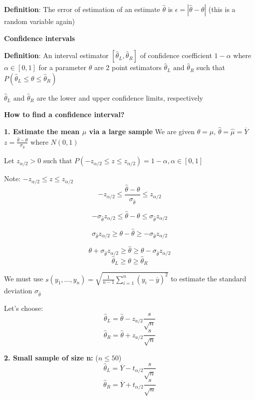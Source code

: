 \documentclass[12pt, letterpaper]{article}
\begin{document}
\textbf{Definition}: The error of estimation of an estimate $\hat{\theta}$ is $\epsilon=|\hat{\theta}-\theta|$ (this is a random variable again)\bigskip

\textbf{Confidence intervals}\bigskip

\textbf{Definition}: An interval estimator $[\hat{\theta}_L, \hat{\theta}_R]$ of confidence coefficient $1-\alpha$ where $\alpha \in[0,1]$ for a parameter $\theta$ are 2 point estimators $\hat{\theta}_L \text{ and }\hat{\theta}_R$ such that $P(\hat{\theta}_L\leq \theta \leq \hat{\theta}_R)$\newline

$\hat{\theta}_L \text{ and } \hat{\theta}_R$ are the lower and upper confidence limits, respectively\newline

\textbf{How to find a confidence interval?}

\textbf{1. Estimate the mean $\mu$ via a large sample}\newline
We are given $\theta =\mu \text{, }\hat{\theta} = \hat{\mu}=\overline{Y}$
$z=\frac{\hat{\theta}-\theta}{\sigma_{\hat{\theta}}} \text{ where } N(0,1)$

Let $z_{\alpha/2}>0 \text{ such that } P(-z_{\alpha/2}\leq z\leq z_{\alpha/2})= 1-\alpha, \alpha \in [0,1]$

Note: $-z_{\alpha/2}\leq z\leq z_{\alpha/2}$
$$-z_{\alpha/2}\leq \frac{\hat{\theta}-\theta}{\sigma_{\hat{\theta}}}\leq z_{\alpha/2} $$

$$-\sigma_{\hat{\theta}}z_{\alpha/2}\leq \hat{\theta}-\theta \leq \sigma_{\hat{\theta}}z_{\alpha/2} $$

$$\sigma_{\hat{\theta}}z_{\alpha/2}\geq \theta-\hat{\theta} \geq -\sigma_{\hat{\theta}}z_{\alpha/2} $$

$$\theta+\sigma_{\hat{\theta}}z_{\alpha/2}\geq \hat{\theta} \geq \theta-\sigma_{\hat{\theta}}z_{\alpha/2} $$
$$\hat{\theta}_L\geq \theta\geq \hat{\theta}_R$$

We must use $\boxed{s(y_1, ..., y_n)= \sqrt{\frac{1}{n-1} \sum_{i=1}^{n} (y_i-\overline{y})^2}}$ to estimate the standard deviation $\sigma_{\hat{\theta}}$

Let's choose:
$$\hat{\theta}_L=\hat{\theta}-z_{a/2}\frac{s}{\sqrt{n}}$$
$$\hat{\theta}_R=\hat{\theta}+z_{a/2}\frac{s}{\sqrt{n}}$$\pagebreak

\textbf{2. Small sample of size n: }($n\leq50$)\newline
$$\hat{\theta}_L=\overline{Y}-t_{\alpha/2}\frac{s}{\sqrt{n}}$$
$$\hat{\theta}_R=\overline{Y}+t_{\alpha/2}\frac{s}{\sqrt{n}}$$
\end{document}
